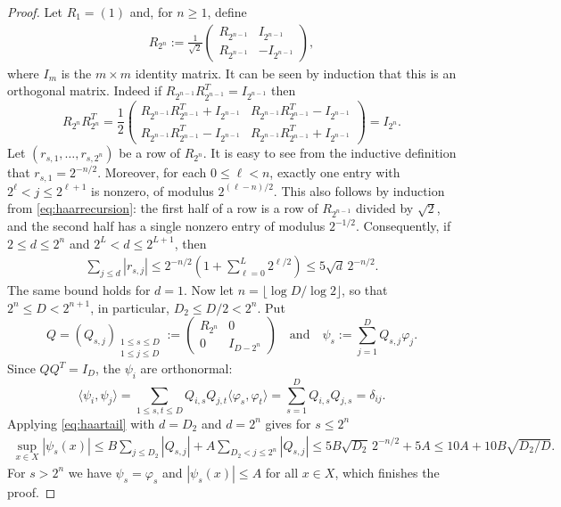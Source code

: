 \documentclass[a4paper,reqno,12pt]{amsart}
\theoremstyle{plain}
\theoremstyle{plain}
\theoremstyle{remark}
\theoremstyle{plain}
\newcommand{\p}{\varphi}
\theoremstyle{plain}
\theoremstyle{plain}
\begin{document}
{\begin{proof}
Let $R_1=(1)$ and, for $n\ge1$, define
\begin{align}
R_{2^n}:=\frac1{\sqrt2}
\begin{pmatrix}
R_{2^{n-1}}&I_{2^{n-1}}\\
R_{2^{n-1}}&-I_{2^{n-1}}
\end{pmatrix},
\label{eq:haarrecursion}
\end{align}
where $I_m$ is the $m\times m$ identity matrix.
It can be seen by induction that this is an orthogonal matrix. 
Indeed if $R_{2^{n - 1}} R_{2^{n - 1}}^T = I_{2^{n - 1}}$ then 
$$
R_{2^n} R_{2^n}^{T} = \frac{1}{2} \begin{pmatrix}
R_{2^{n - 1}} R_{2^{n - 1}}^T + I_{2^{n - 1}} & R_{2^{n - 1}} R_{2^{n - 1}}^T - I_{2^{n - 1}} \\ 
R_{2^{n - 1}} R_{2^{n - 1}}^T - I_{2^{n - 1}} & R_{2^{n - 1}} R_{2^{n - 1}}^T + I_{2^{n - 1}}
\end{pmatrix}  = I_{2^n}.
$$ 
Let $(r_{s,1},{\ldots},r_{s,2^n})$ be a row of $R_{2^n}$.
It is easy to see from the inductive definition that $r_{s,1}=2^{-n/2}$. 
Moreover, for each $0\le\ell<n$,
exactly one entry with $2^\ell<j\le2^{\ell+1}$ is nonzero,
of modulus $2^{(\ell-n)/2}$. This also follows by induction from
\eqref{eq:haarrecursion}: the first half of a row is a row of
$R_{2^{n-1}}$ divided by $\sqrt2$, and the second half has
a single nonzero entry of modulus $2^{-1/2}$. Consequently,
if $2\le d\le2^n$ and $2^L<d\le2^{L+1}$, then
\begin{align}
\sum_{j\le d}|r_{s,j}|
\le2^{-n/2}\left(1+\sum_{\ell=0}^L2^{\ell/2}\right)
\le5\sqrt d\,2^{-n/2}.
\label{eq:haartail}
\end{align}
The same bound holds for $d=1$. Now let $n=\lfloor\log D / \log 2\rfloor$, so that
$2^n\le D<2^{n+1}$, in particular, $D_2\le D/2<2^n$. Put
\[
Q = (Q_{s,j})_{\substack{1 \leq s \leq D \\ 1 \leq j \leq D}} := \begin{pmatrix} R_{2^n} & 0 \\ 0 & I_{D - 2^n} \end{pmatrix}
  \quad \text{and} \quad
\psi_s:=\sum_{j=1}^D Q_{s,j}\p_j.
\]
Since $Q Q^T = I_D$, the $\psi_i$ are orthonormal:
$$
\langle \psi_i, \psi_j \rangle = \sum_{1 \leq s, t \leq D} Q_{i, s} Q_{j, t} \langle \p_s, \p_t \rangle = \sum_{s = 1}^{D} Q_{i,s} Q_{j, s} = \delta_{i j}.
$$
Applying \eqref{eq:haartail} with $d=D_2$
and $d=2^n$ gives for $s \leq 2^n$
\begin{align*}
\sup_{x \in X} |\psi_s(x)|
\le B\sum_{j\le D_2}|Q_{s,j}|
   +A\sum_{D_2<j\le2^n}|Q_{s,j}|
\le5B\sqrt{D_2}\,2^{-n/2}+5A
\le10A+10B\sqrt{D_2/D}.
\end{align*}
For $s>2^n$ we have $\psi_s=\p_s$ and $|\psi_s(x)| \leq A$ for all $x \in X$, which finishes the proof.
\end{proof}


}
\end{document}
